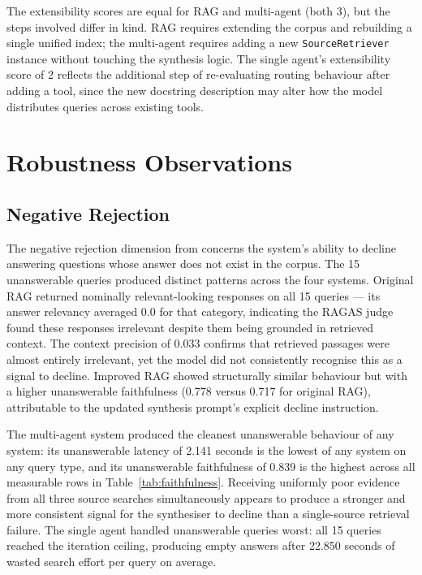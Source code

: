The extensibility scores are equal for RAG and multi-agent (both 3), but the steps involved differ in kind. RAG requires extending the corpus and rebuilding a single unified index; the multi-agent requires adding a new \texttt{SourceRetriever} instance without touching the synthesis logic. The single agent's extensibility score of 2 reflects the additional step of re-evaluating routing behaviour after adding a tool, since the new docstring description may alter how the model distributes queries across existing tools.


\section{Robustness Observations}
\label{sec:robustness}

\subsection*{Negative Rejection}

The negative rejection dimension from  concerns the system's ability to decline answering questions whose answer does not exist in the corpus. The 15 unanswerable queries produced distinct patterns across the four systems. Original RAG returned nominally relevant-looking responses on all 15 queries — its answer relevancy averaged 0.0 for that category, indicating the RAGAS judge found these responses irrelevant despite them being grounded in retrieved context. The context precision of 0.033 confirms that retrieved passages were almost entirely irrelevant, yet the model did not consistently recognise this as a signal to decline. Improved RAG showed structurally similar behaviour but with a higher unanswerable faithfulness (0.778 versus 0.717 for original RAG), attributable to the updated synthesis prompt's explicit decline instruction.

The multi-agent system produced the cleanest unanswerable behaviour of any system: its unanswerable latency of 2.141 seconds is the lowest of any system on any query type, and its unanswerable faithfulness of 0.839 is the highest across all measurable rows in Table~\ref{tab:faithfulness}. Receiving uniformly poor evidence from all three source searches simultaneously appears to produce a stronger and more consistent signal for the synthesiser to decline than a single-source retrieval failure. The single agent handled unanswerable queries worst: all 15 queries reached the iteration ceiling, producing empty answers after 22.850 seconds of wasted search effort per query on average.

